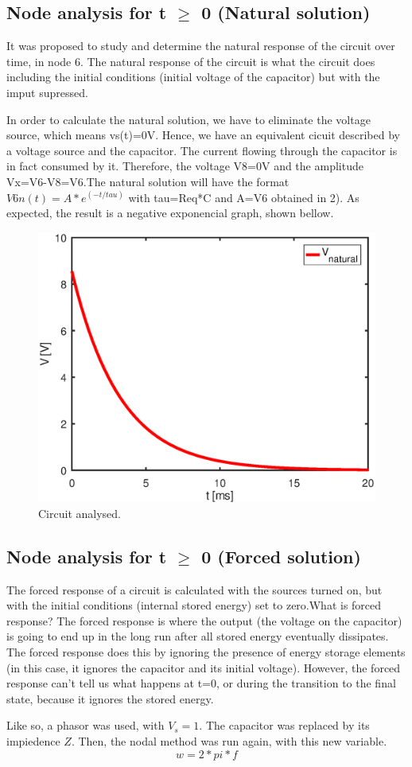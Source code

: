 \subsection{Node analysis for t $\ge$ 0 (Natural solution)}


It was proposed to study and determine the natural response of the circuit over time, in node 6. The natural response of the circuit is what the circuit does including the initial conditions (initial voltage of the capacitor) but with the imput supressed. 

In order to calculate the natural solution, we have to eliminate the voltage source, which means vs(t)=0V. Hence, we have an equivalent cicuit described by a voltage source and the capacitor. The current flowing through the capacitor is in fact consumed by it. Therefore, the voltage V8=0V and the amplitude Vx=V6-V8=V6.The natural solution will have the format $V{6n}(t)=A*e^{(-t/tau)}$ with tau=Req*C and A=V6 obtained in 2). As expected, the result is a negative exponencial graph, shown bellow.

\begin{figure}[ht] \centering
\includegraphics[width=0.5\linewidth]{natural.eps}
\caption{Circuit analysed.}
\label{fig:sim3}
\end{figure}



\subsection{Node analysis for t $\ge$ 0 (Forced solution)}

The forced response of a circuit is calculated with the sources turned on, but with the initial conditions (internal stored energy) set to zero.What is forced response? The forced response is where the output (the voltage on the capacitor) is going to end up in the long run after all stored energy eventually dissipates. The forced response does this by ignoring the presence of energy storage elements (in this case, it ignores the capacitor and its initial voltage). However, the forced response can't tell us what happens at t=0, or during the transition to the final state, because it ignores the stored energy. 
\par Like so, a phasor was used, with $V_{s}=1$. The capacitor was replaced by its impiedence $Z$. Then, the nodal method was run again, with this new variable.
\begin{equation}
w=2*pi*f
\end{equation} 

